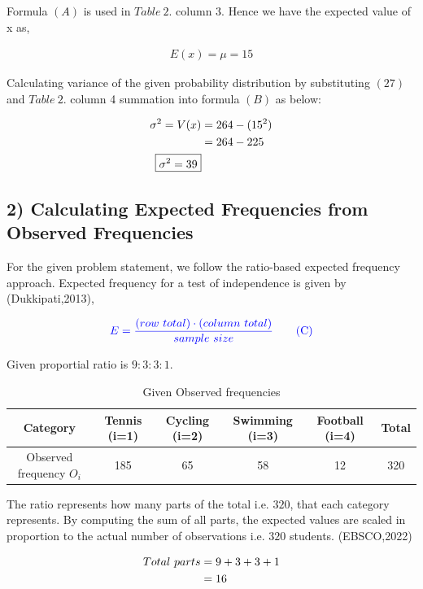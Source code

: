 \documentclass[a4paper]{report}
\begin{document}
Formula $(A)$ is used in $Table\ 2.$ column 3. Hence we have the expected value of x as,

\begin{align}
    \boxed{E(x)=\mu = 15}
\end{align}

Calculating variance of the given probability distribution by substituting $(27)$ and $Table\ 2.$ column 4 summation into formula $(B)$ as below:


\begin{align}
    \notag \sigma ^2 = V(x) &= 264-(15^2) \\
    \notag &=264-225 \\
    \boxed{\sigma ^2=39}
\end{align}

\subsection*{2) Calculating Expected Frequencies from Observed Frequencies}


For the given problem statement, we follow the ratio-based expected frequency approach. Expected frequency for a test of independence is given by (Dukkipati,2013),

\begin{equation*}
    \color{blue}E=\frac{(row\ total)\cdot (column\ total)}{sample\ size} \tag{C}
\end{equation*}

Given proportial ratio is $9:3:3:1$. 

\begin{table}[h]
    \centering
    \begin{tabular}{|c|c|c|c|c|c|}
        \hline
         Category & Tennis (i=1) & Cycling (i=2) & Swimming (i=3) & Football (i=4) & Total \\ \hline
        Observed frequency $O_i$   & 185 & 65 & 58 & 12 & 320  \\ \hline
    \end{tabular}
    \caption{Given Observed frequencies}
    \label{tab:sample_table_3x5}
\end{table}

The ratio represents how many parts of the total i.e. $320$, that each category represents.
By computing the sum of all parts, the expected values are scaled in proportion to the actual number of observations i.e. $320$ students. (EBSCO,2022)

\begin{align}
    \notag Total\ parts&=9+3+3+1 \\
    &=16
\end{align}
\end{document}
